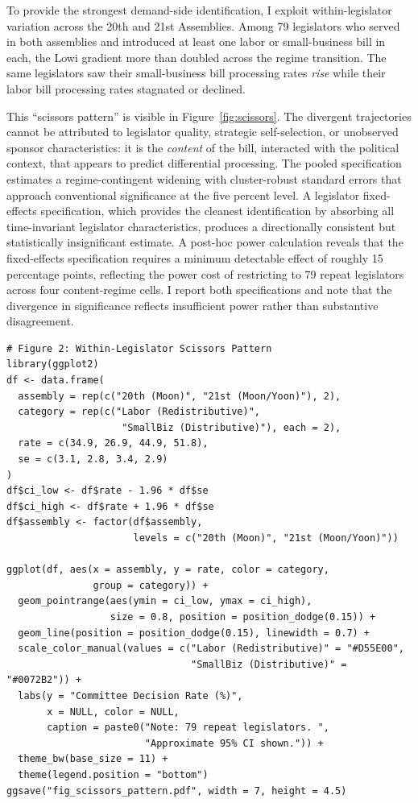 \documentclass[11pt]{article}
\begin{document}
To provide the strongest demand-side identification, I exploit within-legislator variation across the 20th and 21st Assemblies. Among 79 legislators who served in both assemblies and introduced at least one labor or small-business bill in each, the Lowi gradient more than doubled across the regime transition. The same legislators saw their small-business bill processing rates \emph{rise} while their labor bill processing rates stagnated or declined.

This ``scissors pattern'' is visible in Figure~\ref{fig:scissors}. The divergent trajectories cannot be attributed to legislator quality, strategic self-selection, or unobserved sponsor characteristics: it is the \emph{content} of the bill, interacted with the political context, that appears to predict differential processing. The pooled specification estimates a regime-contingent widening with cluster-robust standard errors that approach conventional significance at the five percent level. A legislator fixed-effects specification, which provides the cleanest identification by absorbing all time-invariant legislator characteristics, produces a directionally consistent but statistically insignificant estimate. A post-hoc power calculation reveals that the fixed-effects specification requires a minimum detectable effect of roughly 15 percentage points, reflecting the power cost of restricting to 79 repeat legislators across four content-regime cells. I report both specifications and note that the divergence in significance reflects insufficient power rather than substantive disagreement.

\begin{verbatim}
# Figure 2: Within-Legislator Scissors Pattern
library(ggplot2)
df <- data.frame(
  assembly = rep(c("20th (Moon)", "21st (Moon/Yoon)"), 2),
  category = rep(c("Labor (Redistributive)",
                    "SmallBiz (Distributive)"), each = 2),
  rate = c(34.9, 26.9, 44.9, 51.8),
  se = c(3.1, 2.8, 3.4, 2.9)
)
df$ci_low <- df$rate - 1.96 * df$se
df$ci_high <- df$rate + 1.96 * df$se
df$assembly <- factor(df$assembly,
                      levels = c("20th (Moon)", "21st (Moon/Yoon)"))

ggplot(df, aes(x = assembly, y = rate, color = category,
               group = category)) +
  geom_pointrange(aes(ymin = ci_low, ymax = ci_high),
                  size = 0.8, position = position_dodge(0.15)) +
  geom_line(position = position_dodge(0.15), linewidth = 0.7) +
  scale_color_manual(values = c("Labor (Redistributive)" = "#D55E00",
                                "SmallBiz (Distributive)" = "#0072B2")) +
  labs(y = "Committee Decision Rate (%)",
       x = NULL, color = NULL,
       caption = paste0("Note: 79 repeat legislators. ",
                        "Approximate 95% CI shown.")) +
  theme_bw(base_size = 11) +
  theme(legend.position = "bottom")
ggsave("fig_scissors_pattern.pdf", width = 7, height = 4.5)
\end{verbatim}
\end{document}
